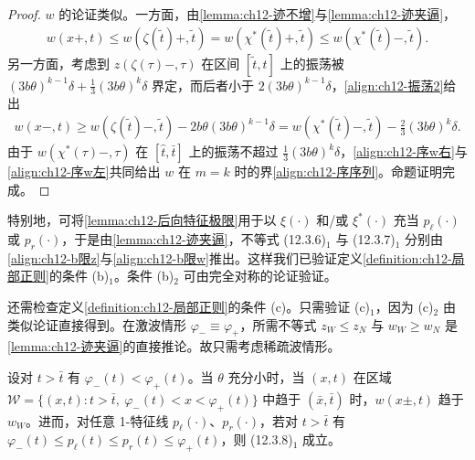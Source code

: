 \documentclass[../../main.tex]{subfiles}
\begin{document}
\begin{proof}
$w$ 的论证类似。一方面，由\cref{lemma:ch12-迹不增}与\cref{lemma:ch12-迹夹逼}，
\begin{align}
w(x+,t)\leqslant w(\zeta(\tilde t)+,\tilde t)=w(\chi^*(\tilde t)+,\tilde t)\leqslant w(\chi^*(\tilde t)-,\tilde t).
\label{align:ch12-序w右}
\end{align}
另一方面，考虑到 $z(\zeta(\tau)-,\tau)$ 在区间 $[\tilde t,t]$ 上的振荡被 $(3b\theta)^{k-1}\delta+\frac13(3b\theta)^k\delta$ 界定，而后者小于 $2(3b\theta)^{k-1}\delta$，\eqref{align:ch12-振荡2}给出
\begin{align}
w(x-,t)\geqslant w(\zeta(\tilde t)-,\tilde t)-2b\theta(3b\theta)^{k-1}\delta=w(\chi^*(\tilde t)-,\tilde t)-\frac23(3b\theta)^k\delta.
\label{align:ch12-序w左}
\end{align}
由于 $w(\chi^*(\tau)-,\tau)$ 在 $[\hat t,\bar t]$ 上的振荡不超过 $\frac13(3b\theta)^k\delta$，\eqref{align:ch12-序w右}与\eqref{align:ch12-序w左}共同给出 $w$ 在 $m=k$ 时的界\eqref{align:ch12-序序列}。命题证明完成。
\end{proof}

特别地，可将\cref{lemma:ch12-后向特征极限}用于以 $\xi(\cdot)$ 和/或 $\xi^*(\cdot)$ 充当 $p_\ell(\cdot)$ 或 $p_r(\cdot)$，于是由\cref{lemma:ch12-迹夹逼}，不等式 (12.3.6)$_1$ 与 (12.3.7)$_1$ 分别由\eqref{align:ch12-b限z}与\eqref{align:ch12-b限w}推出。这样我们已验证定义\cref{definition:ch12-局部正则}的条件 (b)$_1$。条件 (b)$_2$ 可由完全对称的论证验证。

还需检查定义\cref{definition:ch12-局部正则}的条件 (c)。只需验证 (c)$_1$，因为 (c)$_2$ 由类似论证直接得到。在激波情形 $\varphi_-\equiv\varphi_+$，所需不等式 $z_W\leqslant z_N$ 与 $w_W\geqslant w_N$ 是\cref{lemma:ch12-迹夹逼}的直接推论。故只需考虑稀疏波情形。

\begin{lemma}\label{lemma:ch12-北区域出波}
设对 $t>\bar t$ 有 $\varphi_-(t)<\varphi_+(t)$。当 $\theta$ 充分小时，当 $(x,t)$ 在区域 $\mathscr{W}=\{(x,t):t>\bar t,\ \varphi_-(t)<x<\varphi_+(t)\}$ 中趋于 $(\bar x,\bar t)$ 时，$w(x\pm,t)$ 趋于 $w_W$。进而，对任意 1-特征线 $p_\ell(\cdot)$、$p_r(\cdot)$，若对 $t>\bar t$ 有 $\varphi_-(t)\leqslant p_\ell(t)\leqslant p_r(t)\leqslant\varphi_+(t)$，则 (12.3.8)$_1$ 成立。
\end{lemma}
\end{document}
